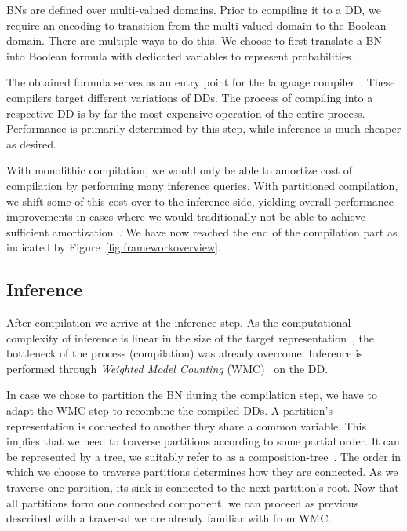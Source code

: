 BNs are defined over multi-valued domains. Prior to compiling it to a DD, we require an encoding to transition from the multi-valued domain to the Boolean domain. There are multiple ways to do this. We choose to first translate a BN into Boolean formula with dedicated variables to represent probabilities~\cite{chavira2008probabilistic,dal2017wpbdd}.

The obtained formula serves as an entry point for the language compiler~\cite{dudek2020addmc}. These compilers target different variations of DDs. The process of compiling into a respective DD is by far the most expensive operation of the entire process. Performance is primarily determined by this step, while inference is much cheaper as desired.

With monolithic compilation, we would only be able to amortize cost of compilation by performing many inference queries. With partitioned compilation, we shift some of this cost over to the inference side, yielding overall performance improvements in cases where we would traditionally not be able to achieve sufficient amortization~\cite{dal2017reducing}. We have now reached the end of the compilation part as indicated by Figure~\ref{fig:frameworkoverview}.

\subsection{Inference}\label{subsec:inference}

After compilation we arrive at the inference step. As the computational complexity of inference is linear in the size of the target representation~\cite{darwiche2002knowledge}, the bottleneck of the process (compilation) was already overcome. 
Inference is performed
through \emph{Weighted Model Counting} (WMC)~\cite{chavira2008probabilistic} on the DD.

In case we chose to partition the BN during the compilation step, we have to adapt the WMC step to recombine the compiled DDs. A partition's representation is connected to another they share a common variable. This implies that we need to traverse partitions according to some partial order. It can be represented by a tree, we suitably refer to as a composition-tree~\cite{dal2021compositional}. The order in which we choose to traverse partitions determines how they are connected. As we traverse one partition, its sink is connected to the next partition's root. Now that all partitions form one connected component, we can proceed as previous described with a traversal we are already familiar with from WMC.


